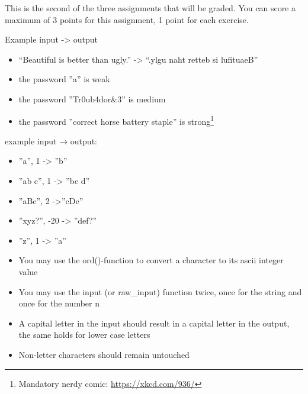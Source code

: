 \documentclass[11pt, a4paper]{article}
\begin{document}
\setcounter{opgave}{1}
This is the second of the three assignments that will be graded.
You can score a maximum of $3$ points for this assignment, 1 point for each exercise.

Example input -> output
\begin{itemize}
\item “Beautiful is better than ugly.” -> “.ylgu naht retteb si lufituaeB”
\end{itemize}



  \begin{itemize}
   \item the password ''a'' is weak
   \item the password ''Tr0ub4dor\&3'' is medium
   \item the password ''correct horse battery staple'' is strong\footnote{Mandatory nerdy comic: \url{https://xkcd.com/936/}}
  \end{itemize}


example input → output:
 \begin{itemize}
 \item ''a'', 1 -> ''b''
 \item ''ab c'', 1 -> ''bc d''
 \item ''aBc'', 2 ->''cDe''
 \item ''xyz?'', -20 -> ''def?''
 \item ''z'', 1 -> ''a''
 \end{itemize}

 \begin{itemize}
\item You may use the ord()-function to convert a character to its ascii integer value
\item You may use the input (or raw\_input) function twice, once for the string and once for the number n
\item A capital letter in the input should result in a capital letter in the output, the same holds for lower case letters
\item Non-letter characters should remain untouched
 \end{itemize}

\einde
\end{document}
